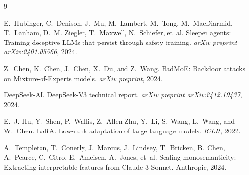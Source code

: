\documentclass[11pt]{article}
\begin{document}

\begin{thebibliography}{9}

E.~Hubinger, C.~Denison, J.~Mu, M.~Lambert, M.~Tong, M.~MacDiarmid, T.~Lanham, D.~M. Ziegler, T.~Maxwell, N.~Schiefer, et~al.
\newblock Sleeper agents: Training deceptive LLMs that persist through safety training.
\newblock \emph{arXiv preprint arXiv:2401.05566}, 2024.

Z.~Chen, K.~Chen, J.~Chen, X.~Du, and Z.~Wang.
\newblock BadMoE: Backdoor attacks on Mixture-of-Experts models.
\newblock \emph{arXiv preprint}, 2024.

DeepSeek-AI.
\newblock DeepSeek-V3 technical report.
\newblock \emph{arXiv preprint arXiv:2412.19437}, 2024.

E.~J. Hu, Y.~Shen, P.~Wallis, Z.~Allen-Zhu, Y.~Li, S.~Wang, L.~Wang, and W.~Chen.
\newblock LoRA: Low-rank adaptation of large language models.
\newblock \emph{ICLR}, 2022.

A.~Templeton, T.~Conerly, J.~Marcus, J.~Lindsey, T.~Bricken, B.~Chen, A.~Pearce, C.~Citro, E.~Ameisen, A.~Jones, et~al.
\newblock Scaling monosemanticity: Extracting interpretable features from Claude 3 Sonnet.
\newblock Anthropic, 2024.

\end{thebibliography}
\end{document}
